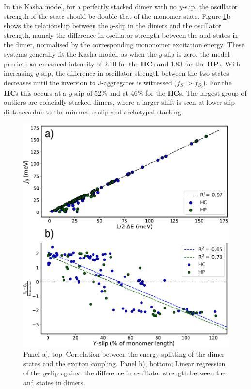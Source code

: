 In the Kasha model, for a perfectly stacked dimer with no $y$-slip, the oscillator strength of the \stwo{} state should be double that of the monomer state. Figure \ref{figure: dimer_regressions}b shows the relationship between the $y$-slip in the dimers and the oscillator strength, namely the difference in oscillator strength between the \stwo{} and \sone{} states in the dimer, normalised by the corresponding mononomer excitation energy. These systems generally fit the Kasha model, as when the $y$-slip is zero, the model predicts an enhanced \stwo{} intensity of 2.10 for the \textbf{HC}s and 1.83 for the \textbf{HP}s. With increasing $y$-slip, the difference in oscillator strength between the two states decreases until the inversion to J-aggregates is witnessed ($f_{S_{1}}>f_{S_{2}}$). For the \textbf{HC}s this occurs at a $y$-slip of 52\% and at 46\% for the \textbf{HC}s. The largest group of outliers are cofacially stacked dimers, where a larger shift is seen at lower slip distances due to the minimal $x$-slip and archetypal stacking.\cite{Gierschner2016} 
\begin{figure}[t]
\centering
  \includegraphics[width=0.8\linewidth]{5ConnectingCrystalStructure/dimer_regressions.pdf}
  \caption[Correlation between the energy splitting and exciton coupling]{Panel a), top; Correlation between the energy splitting of the dimer states and the exciton coupling. Panel b), bottom; Linear regression of the $y$-slip against the difference in oscillator strength between the \stwo{} and \sone{} states in dimers.}
  \label{figure: dimer_regressions}
\end{figure}
